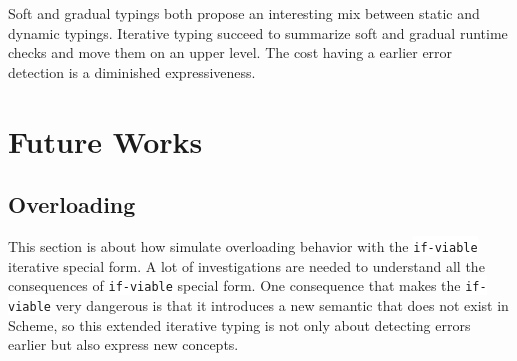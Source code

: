 \documentclass[a4paper]{report}
\newcommand{\ischeme}[1]{\colorbox{white}{\lstinline[language=scheme]&#1&}} %
\begin{document}
Soft and gradual typings both propose an interesting mix between static and dynamic typings. Iterative typing succeed to summarize soft and gradual runtime checks and move them on an upper level. The cost having a earlier error detection is a diminished expressiveness.

\chapter{Future Works\label{ch_future}}

\section{Overloading}

This section is about how simulate overloading behavior with the \ischeme{if-viable} iterative special form. A lot of investigations are needed to understand all the consequences of \ischeme{if-viable} special form. One consequence that makes the \ischeme{if-viable} very dangerous is that it introduces a new semantic that does not exist in Scheme, so this extended iterative typing is not only about detecting errors earlier but also express new concepts.
\end{document}
